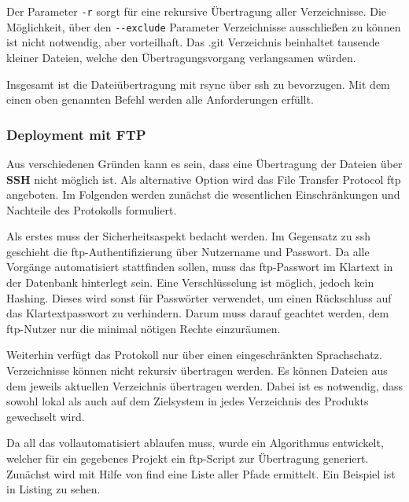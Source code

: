 Der Parameter \lstinline!-r! sorgt für eine rekursive Übertragung aller Verzeichnisse. Die Möglichkeit, über den \lstinline!--exclude! Parameter Verzeichnisse ausschließen zu können ist nicht notwendig, aber vorteilhaft. Das .git Verzeichnis beinhaltet tausende kleiner Dateien, welche den Übertragungsvorgang verlangsamen würden.

Insgesamt ist die Dateiübertragung mit rsync über \gls{ssh} zu bevorzugen. Mit dem einen oben genannten Befehl werden alle Anforderungen erfüllt.


\subsubsection{Deployment mit FTP} %
\label{ssub:deployment_mit_ftp}

Aus verschiedenen Gründen kann es sein, dass eine Übertragung der Dateien über \textbf{SSH} nicht möglich ist. Als alternative Option wird das File Transfer Protocol \gls{ftp} angeboten. Im Folgenden werden zunächst die wesentlichen Einschränkungen und Nachteile des Protokolls formuliert.

Als erstes muss der Sicherheitsaspekt bedacht werden. Im Gegensatz zu \gls{ssh} geschieht die \gls{ftp}-Authentifizierung über Nutzername und Passwort. Da alle Vorgänge automatisiert stattfinden sollen, muss das \gls{ftp}-Passwort im Klartext in der Datenbank hinterlegt sein. Eine Verschlüsselung ist möglich, jedoch kein Hashing. Dieses wird sonst für Passwörter verwendet, um einen Rückschluss auf das Klartextpasswort zu verhindern. Darum muss darauf geachtet werden, dem \gls{ftp}-Nutzer nur die minimal nötigen Rechte einzuräumen.

Weiterhin verfügt das Protokoll nur über einen eingeschränkten Sprachschatz. Verzeichnisse können nicht rekursiv übertragen werden. Es können Dateien aus dem jeweils aktuellen Verzeichnis übertragen werden. Dabei ist es notwendig, dass sowohl lokal als auch auf dem Zielsystem in jedes Verzeichnis des Produkts gewechselt wird.

Da all das vollautomatisiert ablaufen muss, wurde ein Algorithmus entwickelt, welcher für ein gegebenes Projekt ein \gls{ftp}-Script zur Übertragung generiert. Zunächst wird mit Hilfe von find eine Liste aller Pfade ermittelt. Ein Beispiel ist in Listing  zu sehen.

